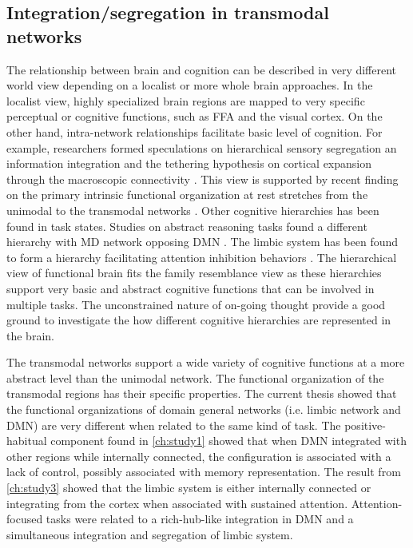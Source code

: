 \subsection{Integration/segregation in transmodal networks}
The relationship between brain and cognition can be described in very different world view depending on a localist or more whole brain approaches. In the localist view, highly specialized brain regions are mapped to very specific perceptual or cognitive functions, such as FFA and the visual cortex. On the other hand, intra-network relationships facilitate basic level of cognition. For example, researchers formed speculations on hierarchical sensory segregation an information integration \cite{Mesulam1998} and the tethering hypothesis on cortical expansion through the macroscopic connectivity \cite{Buckner2013}. This view is supported by recent finding on the primary intrinsic functional organization at rest stretches from the unimodal to the transmodal networks \cite{Margulies2016}. Other cognitive hierarchies has been found in task states. Studies on abstract reasoning tasks found a different hierarchy with MD network opposing DMN \cite{Duncan2010}. The limbic system has been found to form a hierarchy facilitating attention inhibition behaviors \cite{Kleckner2017}. The hierarchical view of functional brain fits the family resemblance view as these hierarchies support very basic and abstract cognitive functions that can be involved in multiple tasks. The unconstrained nature of on-going thought provide a good ground to investigate the how different cognitive hierarchies are represented in the brain.


The transmodal networks support a wide variety of cognitive functions at a more abstract level than the unimodal network. The functional organization of the transmodal regions has their specific properties. The current thesis showed that the functional organizations of domain general networks (i.e. limbic network and DMN) are very different when related to the same kind of task. The positive-habitual component found in \cref{ch:study1} showed that when DMN integrated with other regions while internally connected, the configuration is associated with a lack of control, possibly associated with memory representation. The result from \cref{ch:study3} showed that the limbic system is either internally connected or integrating from the cortex when associated with sustained attention. Attention-focused tasks were related to a rich-hub-like integration in DMN and a simultaneous integration and segregation of limbic system. 

